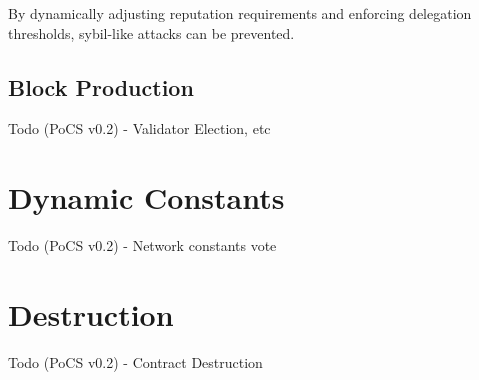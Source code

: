 \documentclass{article}
\begin{document}
By dynamically adjusting reputation requirements and enforcing delegation thresholds, sybil-like attacks can be prevented.

\subsection{Block Production}

Todo (PoCS v0.2) - Validator Election, etc

\section{Dynamic Constants}

Todo (PoCS v0.2) - Network constants vote

\section{Destruction}

Todo (PoCS v0.2) - Contract Destruction
\end{document}
